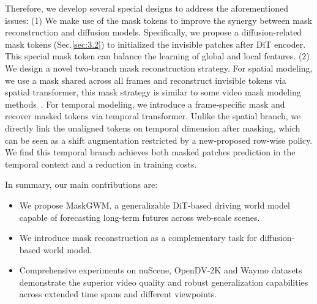 Therefore, we develop several special designs to address the aforementioned issues: (1) We make use of the mask tokens to improve the synergy between mask reconstruction and diffusion models. Specifically, we propose a diffusion-related mask tokens (Sec.\ref{sec:3.2}) 
to initialized the invisible patches after DiT encoder. This special mask token can balance the learning of global and local features.
(2) We design a novel two-branch mask reconstruction strategy. For spatial modeling, we use a mask shared across all frames and reconstruct invisible tokens via spatial transformer, this mask strategy is similar to some video mask modeling methods~\cite{videomae,videomae_v2}. For temporal modeling, we introduce a frame-specific mask and recover masked tokens via temporal transformer. Unlike the spatial branch, we directly link the unaligned tokens on temporal dimension after masking, which can be seen as a shift augmentation restricted by a new-proposed row-wise policy. We find this temporal branch achieves both masked patches prediction in the temporal context and a reduction in training costs.






In summary, our main contributions are:
\begin{itemize}
    \item We propose MaskGWM, a generalizable DiT-based driving world model capable of forecasting long-term futures across web-scale scenes.
    \item We introduce mask reconstruction as a complementary task for diffusion-based world model. 
    \item Comprehensive experiments on nuScene, OpenDV-2K and Waymo datasets demonstrate the superior video quality and robust generalization capabilities across extended time spans and different viewpoints.
\end{itemize}



